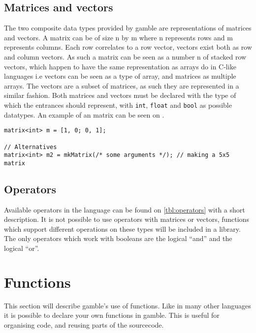 \subsection*{Matrices and vectors}
The two composite data types provided by \gls{gamble} are representations of matrices and vectors.
A matrix can be of size n by m where n represents rows and m represents columns.
Each row correlates to a row vector, vectors exist both as row and column vectors.
As such a matrix can be seen as a number n of stacked row vectors, which happen to have the same representation as arrays do in C-like languages i.e vectors can be seen as a type of array, and matrices as multiple arrays.
The vectors are a subset of matrices, as such they are represented in a similar fashion.
Both matrices and vectors must be declared with the type of which the entrances should represent, with \texttt{int}, \texttt{float} and \texttt{bool} as possible datatypes.
An example of an matrix can be seen on .

\begin{lstlisting}[caption={Creating a matrix},label={lst:matrix}]
matrix<int> m = [1, 0; 0, 1];

// Alternatives
matrix<int> m2 = mkMatrix(/* some arguments */); // making a 5x5 matrix
\end{lstlisting}

\subsection*{Operators}
Available operators in the language can be found on \ref{tbl:operators} with a short description.  
It is not possible to use operators with matrices or vectors, functions which support different operations on these types will be included in a library.
The only operators which work with booleans are the logical ``and'' and the logical ``or''. 


\section{Functions}
This section will describe \gls{gamble}'s use of functions. 
Like in many other languages it is possible to declare your own functions in \gls{gamble}.
This is useful for organising code, and reusing parts of the sourcecode.

